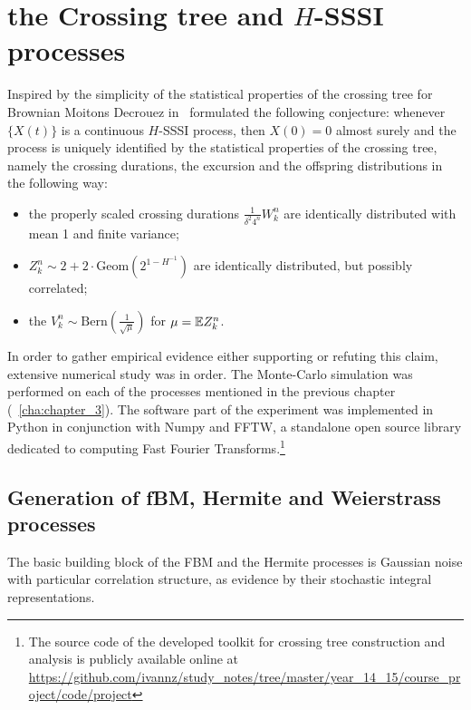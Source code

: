 \chapter{the Crossing tree and $H$-SSSI processes} %
\label{cha:the_crossing_tree_and_h_sssi_processes}

Inspired by the simplicity of the statistical properties of the crossing tree for
Brownian Moitons Decrouez in~\cite{DecrouezConjecture} formulated the following
conjecture: whenever $\{X(t)\}$ is a continuous $H$-SSSI process, then $X(0)= 0$
almost surely and the process is uniquely identified by the statistical properties
of the crossing tree, namely the crossing durations, the excursion and the offspring
distributions in the following way: \begin{itemize}
	\item the properly scaled crossing durations $\tfrac{1}{\delta^2 4^n} W_k^n$
    are identically distributed with mean 1 and finite variance;
    \item $Z_k^n\sim 2+2\cdot\text{Geom}(2^{1-H^{-1}})$ are identically distributed,
    but possibly correlated;
    \item the $V_k^n \sim \text{Bern}(\frac{1}{\sqrt{\mu}})$ for $\mu = \mathbb{E} Z_k^n$.
\end{itemize}

In order to gather empirical evidence either supporting or refuting this claim,
extensive numerical study was in order. The Monte-Carlo simulation was performed
on each of the processes mentioned in the previous chapter (~\ref{cha:chapter_3}).
The software part of the experiment was implemented in Python in conjunction with
Numpy and FFTW, a standalone open source library dedicated to computing Fast Fourier
Transforms.\footnote{The source code of the developed toolkit for crossing tree
construction and analysis is publicly available online at
\url{https://github.com/ivannz/study_notes/tree/master/year_14_15/course_project/code/project}}


\section{Generation of fBM, Hermite and Weierstrass processes} %
\label{sec:generation_of_fbm_hermite_and_weierstrass_processes}

The basic building block of the FBM and the Hermite processes is Gaussian noise
with particular correlation structure, as evidence by their stochastic integral representations.

